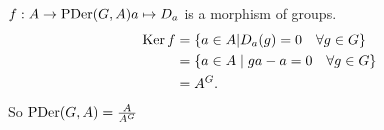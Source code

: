 \begin{remark}
    $f: A \to  \operatorname{PDer}(G,A) a \mapsto D_a$ is a morphism of groups.
    \begin{align*}\operatorname{Ker} f
    &= \{ a \in A | D_a(g) = 0 \quad \forall  g \in G\}\\
    &= \{ a \in A  \mid  ga - a = 0 \quad \forall  g \in  G\} \\
    &= A^{G}.
    \end{align*}
    So $\operatorname{PDer}(G, A) = \frac{A}{A^{G}}$
\end{remark}
